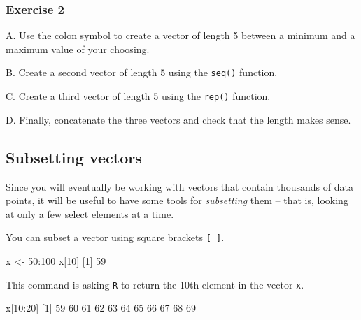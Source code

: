 \documentclass[
]{book}
\newenvironment{Shaded}{\begin{snugshade}}{\end{snugshade}}
\newcommand{\DecValTok}[1]{\textcolor[rgb]{0.00,0.00,0.81}{#1}}
\newcommand{\NormalTok}[1]{#1}
\newcommand{\OtherTok}[1]{\textcolor[rgb]{0.56,0.35,0.01}{#1}}
\newcommand{\SpecialCharTok}[1]{\textcolor[rgb]{0.00,0.00,0.00}{#1}}
\begin{document}
\hypertarget{exercise-2-2}{%
\subsubsection*{Exercise 2}\label{exercise-2-2}}

A. Use the colon symbol to create a vector of length 5 between a minimum and a maximum value of your choosing.

B. Create a second vector of length 5 using the \texttt{seq()} function.

C. Create a third vector of length 5 using the \texttt{rep()} function.

D. Finally, concatenate the three vectors and check that the length makes sense.

\hypertarget{subsetting-vectors}{%
\subsection*{Subsetting vectors}\label{subsetting-vectors}}

Since you will eventually be working with vectors that contain thousands of data points, it will be useful to have some tools for \emph{subsetting} them -- that is, looking at only a few select elements at a time.

You can subset a vector using square brackets \texttt{{[}\ {]}}.

\begin{Shaded}
\begin{Highlighting}[]
\NormalTok{x }\OtherTok{\textless{}{-}} \DecValTok{50}\SpecialCharTok{:}\DecValTok{100}
\NormalTok{x[}\DecValTok{10}\NormalTok{]}
\NormalTok{[}\DecValTok{1}\NormalTok{] }\DecValTok{59}
\end{Highlighting}
\end{Shaded}

This command is asking \texttt{R} to return the 10th element in the vector \texttt{x}.

\begin{Shaded}
\begin{Highlighting}[]
\NormalTok{x[}\DecValTok{10}\SpecialCharTok{:}\DecValTok{20}\NormalTok{]}
\NormalTok{ [}\DecValTok{1}\NormalTok{] }\DecValTok{59} \DecValTok{60} \DecValTok{61} \DecValTok{62} \DecValTok{63} \DecValTok{64} \DecValTok{65} \DecValTok{66} \DecValTok{67} \DecValTok{68} \DecValTok{69}
\end{Highlighting}
\end{Shaded}
\end{document}
